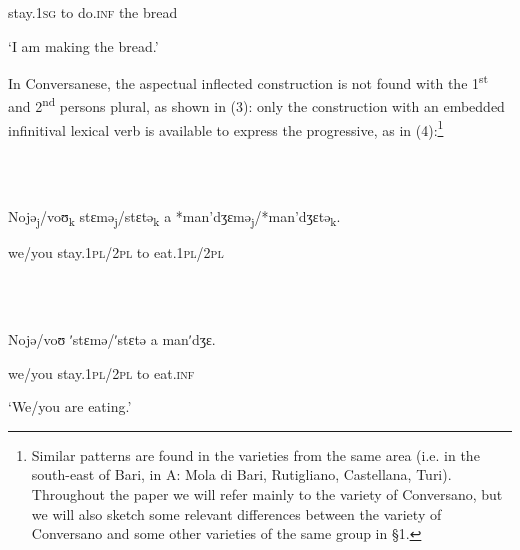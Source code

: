 \documentclass[output=paper]{langsci/langscibook}
\begin{document}
  stay.\textsc{1sg} to   do.\textsc{inf}    the    bread

‘I am making the bread.’

In Conversanese, the aspectual inflected construction is not found with the 1\textsuperscript{st} and 2\textsuperscript{nd} persons plural, as shown in (3): only the construction with an embedded infinitival lexical verb is available to express the progressive, as in (4):\footnote{Similar patterns are found in the varieties from the same area (i.e. in the south-east of Bari, in A: Mola di Bari, Rutigliano, Castellana, Turi). Throughout the paper we will refer mainly to the variety of Conversano, but we will also sketch some relevant differences between the variety of Conversano and some other varieties of the same group in §1.}

\ea%
    \label{ex:key:3}
    \gll\\
        \\
    \glt
    \z

          Nojə\textsubscript{j}/voʊ\textsubscript{k}   stɛmə\textsubscript{j}/stɛtə\textsubscript{k}   a   *man’dʒɛmə\textsubscript{j}/*man’dʒɛtə\textsubscript{k}.

we/you  stay.\textsc{1pl}/\textsc{2pl} to   eat.\textsc{1pl}/\textsc{2pl} 

\ea%
    \label{ex:key:4}
    \gll\\
        \\
    \glt
    \z

          Nojə/voʊ   ʹstɛmə/ʹstɛtə   a  manʹdʒɛ.

we/you   stay.\textsc{1pl}/\textsc{2pl} to   eat.\textsc{inf}

‘We/you are eating.’
\end{document}
